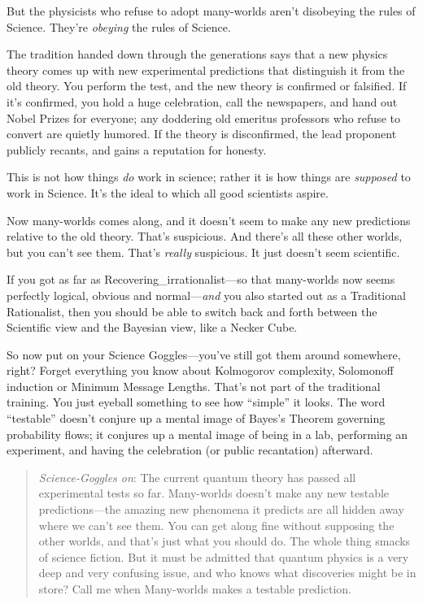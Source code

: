 {
 But the physicists who refuse to adopt many-worlds
aren't disobeying the rules of Science.
They're \textit{obeying} the rules of Science.}

{
 The tradition handed down through the generations says that a new
physics theory comes up with new experimental predictions that
distinguish it from the old theory. You perform the test, and the new
theory is confirmed or falsified. If it's confirmed,
you hold a huge celebration, call the newspapers, and hand out Nobel
Prizes for everyone; any doddering old emeritus professors who refuse
to convert are quietly humored. If the theory is disconfirmed, the lead
proponent publicly recants, and gains a reputation for honesty.}

{
 This is not how things \textit{do} work in science; rather it is
how things are \textit{supposed} to work in Science.
It's the ideal to which all good scientists aspire.}

{
 Now many-worlds comes along, and it doesn't seem
to make any new predictions relative to the old theory.
That's suspicious. And there's all
these other worlds, but you can't see them.
That's \textit{really} suspicious. It just
doesn't seem scientific.}

{
 If you got as far as Recovering\_irrationalist---so that
many-worlds now seems perfectly logical, obvious and
normal---\textit{and} you also started out as a Traditional
Rationalist, then you should be able to switch back and forth between
the Scientific view and the Bayesian view, like a Necker Cube.}

{
 So now put on your Science Goggles---you've still
got them around somewhere, right? Forget everything you know about
Kolmogorov complexity, Solomonoff induction or Minimum Message Lengths.
That's not part of the traditional training. You just
eyeball something to see how
``simple'' it looks. The word
``testable'' doesn't
conjure up a mental image of Bayes's Theorem governing
probability flows; it conjures up a mental image of being in a lab,
performing an experiment, and having the celebration (or public
recantation) afterward.}

\begin{quote}
{
 \textit{Science-Goggles on}: The current quantum theory has passed
all experimental tests so far. Many-worlds doesn't make
any new testable predictions---the amazing new phenomena it predicts
are all hidden away where we can't see them. You can
get along fine without supposing the other worlds, and
that's just what you should do. The whole thing smacks
of science fiction. But it must be admitted that quantum physics is a
very deep and very confusing issue, and who knows what discoveries
might be in store? Call me when Many-worlds makes a testable
prediction.}
\end{quote}

